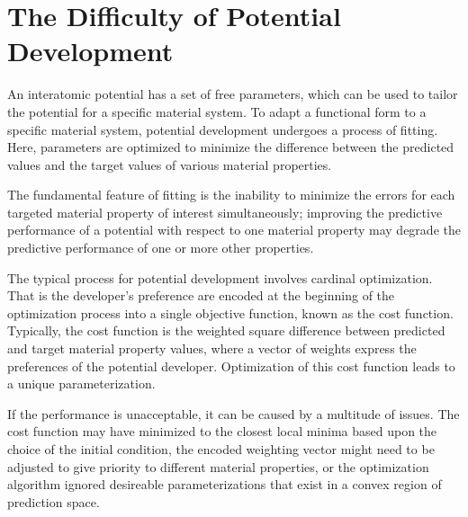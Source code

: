 \section{The Difficulty of Potential Development}


An interatomic potential has a set of free parameters, which can be used to tailor the potential for a specific material system.  To adapt a functional form to a specific material system, potential development undergoes a process of fitting.  Here, parameters are optimized to minimize the difference between the predicted values and the target values of various material properties.

The fundamental feature of fitting is the inability to minimize the errors for each targeted material property of interest simultaneously; improving the predictive performance of a potential with respect to one material property may degrade the predictive performance of one or more other properties.

The typical process for potential development involves cardinal optimization.  That is the developer's preference are encoded at the beginning of the optimization process into a single objective function, known as the cost function.  Typically, the cost function is the weighted square difference between predicted and target material property values, where a vector of weights express the preferences of the potential developer.  Optimization of this cost function leads to a unique parameterization.

If the performance is unacceptable, it can be caused by a multitude of issues.  The cost function may have minimized to the closest local minima based upon the choice of the initial condition, the encoded weighting vector might need to be adjusted to give priority to different material properties, or the optimization algorithm ignored desireable parameterizations that exist in a convex region of prediction space.

